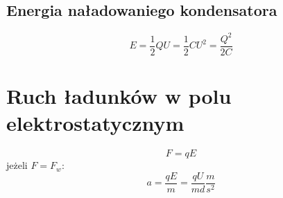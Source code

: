    \subsection{Energia naładowaniego kondensatora}
      \begin{equation}
        E = \frac{1}{2}QU = \frac{1}{2}CU^2 = \frac{Q^2}{2C}
      \end{equation}
  \section{Ruch ładunków w polu elektrostatycznym}
    \begin{equation}
      F = qE
    \end{equation}
    jeżeli $F = F_w$:
    \begin{equation}
      a = \frac{qE}{m} = \frac{qU}{md} \unit{\frac{m}{s^2}}
    \end{equation}
